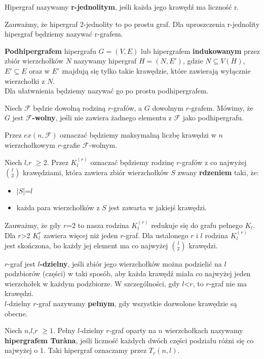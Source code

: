 \documentclass[miz,woman]{mgrwms}
\begin{document}
\begin{defi}
 Hipergraf nazywamy \textbf{r-jednolitym}, jeśli każda jego krawędź ma liczność r.\\
\end{defi}
Zauważmy, że hipergraf 2-jednolity to po prostu graf.
Dla uproszczenia r-jednolity hipergraf będziemy nazywać r-grafem.\\
\begin{defi}
 \textbf{Podhipergrafem }hipergrafu $G=(V,E)$ lub hipergrafem \textbf{indukowanym} przez zbiór wierzchołków $N$ nazywamy hipergraf $H=(N,E')$, gdzie
$N \subseteq V(H)$, $E'\subseteq E$ oraz w $E'$ znajdują się tylko takie krawędzie, które zawierają wyłącznie wierzchołki z $N$.\\
Dla ułatwnienia będziemy nazywać go po prostu podhipergrafem.\\
\end{defi}
\begin{defi}
 Niech $\mathcal{F}$ będzie dowolną rodziną $r$-grafów, a $G$ dowolnym $r$-grafem. Mówimy, że $G$ jest \textbf{{$\mathcal{F}$}-wolny},
jeśli nie zawiera żadnego elementu z $\mathcal{F}$ jako podhipergrafu.
\\
\end{defi}
Przez $ex(n,\mathcal{F})$ oznaczać będziemy maksymalną liczbę krawędzi w $n$ wierzchołkowym $r$-grafie $\mathcal{F}$-wolnym.\\
\begin{defi}
 Niech $l$,$r$ $\geq$2. Przez $K_l^{(r)}$ oznaczać będziemy rodzinę $r$-grafów z co najwyżej $l \choose 2$ krawędziami,
która zawiera zbiór wierzchołków $S$ zwany \textbf{rdzeniem} taki, że:
\begin{itemize}
 \item |$S$|=$l$
 \item każda para wierzchołków z $S$ jest zawarta w jakiejś krawędzi.
\end{itemize}
\end{defi}

Zauważmy, że gdy $r$=2 to nasza rodzina $K_l^{(r)}$ redukuje się do grafu pełnego $K_l$. Dla $r$>2 $K_l^{r}$ zawiera więcej niż jeden $r$-graf.
Dla ustalonego $r$ i $l$ rodzina $K_l^{(r)}$ jest skończona, bo każdy jej element ma co najwyżej $l \choose 2$ krawędzi.\\



\begin{defi}
  $r$-graf jest \textbf{$l$-dzielny}, jeśli zbiór jego wierzchołków można podzielić na $l$ podzbiorów (części) w taki sposób, aby
każda krawędź miała co najwyżej jeden wierzchołek w każdym podzbiorze.
W szczególności, gdy $l$<$r$, to $r$-graf nie ma krawędzi.\\
$l$-dzielny $r$-graf nazywamy \textbf{pełnym}, gdy wszystkie dozwolone krawędzie są obecne.
\end{defi}
\begin{defi}
Niech $n$,$l$,$r$ $\geq 1$. Pełny $l$-dzielny $r$-graf oparty na $n$ wierzchołkach nazywamy \textbf{hipergrafem Tur\`{a}na},
jeśli liczność każdych dwóch części podziału różni się co najwyżej o 1. Taki hipergraf oznaczamy przez $T_r(n,l)$.
\end{defi}
\end{document}
